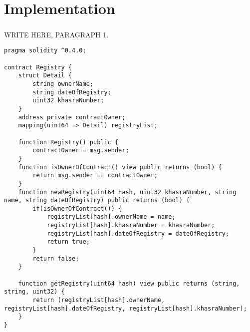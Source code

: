 \chapter{Implementation}
\paragraph{}WRITE HERE, PARAGRAPH 1.

\begin{lstlisting}
pragma solidity ^0.4.0;

contract Registry {
    struct Detail {
        string ownerName;
        string dateOfRegistry;
        uint32 khasraNumber;
    }
    address private contractOwner;
    mapping(uint64 => Detail) registryList;
    
    function Registry() public {
        contractOwner = msg.sender;
    }
    function isOwnerOfContract() view public returns (bool) {
        return msg.sender == contractOwner;
    }
    function newRegistry(uint64 hash, uint32 khasraNumber, string name, string dateOfRegistry) public returns (bool) {
        if(isOwnerOfContract()) {
            registryList[hash].ownerName = name;
            registryList[hash].khasraNumber = khasraNumber;
            registryList[hash].dateOfRegistry = dateOfRegistry;
            return true;
        }
        return false;
    }
    
    function getRegistry(uint64 hash) view public returns (string, string, uint32) {
        return (registryList[hash].ownerName, registryList[hash].dateOfRegistry, registryList[hash].khasraNumber);
    }
}
\end{lstlisting}
